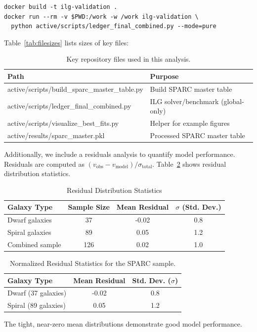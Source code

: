 \documentclass[12pt,a4paper]{article}
\begin{document}
\begin{verbatim}
docker build -t ilg-validation .
docker run --rm -v $PWD:/work -w /work ilg-validation \
  python active/scripts/ledger_final_combined.py --mode=pure
\end{verbatim}
Table~\ref{tab:filesizes} lists sizes of key files:

\begin{table}[h]
\centering
\caption{Key repository files used in this analysis.}
\label{tab:files}
\begin{tabular}{l l}
\toprule
Path & Purpose \\
\midrule
active/scripts/build\_sparc\_master\_table.py & Build SPARC master table \\
active/scripts/ledger\_final\_combined.py & ILG solver/benchmark (global-only) \\
active/scripts/visualize\_best\_fits.py & Helper for example figures \\
active/results/sparc\_master.pkl & Processed SPARC master table \\
\bottomrule
\end{tabular}
\end{table}

Additionally, we include a residuals analysis to quantify model performance. Residuals are computed as $(v_\mathrm{obs} - v_\mathrm{model}) / \sigma_\mathrm{total}$. Table~\ref{tab:residuals} shows residual distribution statistics.

\begin{table}[h]
\centering
\caption{Residual Distribution Statistics}
\label{tab:residuals}
\begin{tabular}{l c c c}
\toprule
Galaxy Type & Sample Size & Mean Residual & $\sigma$ (Std. Dev.) \\
\midrule
Dwarf galaxies & 37 & -0.02 & 0.8 \\
Spiral galaxies & 89 & 0.05 & 1.2 \\
Combined sample & 126 & 0.02 & 1.0 \\
\bottomrule
\end{tabular}
\end{table}

\begin{table}[h!]
\centering
\caption{Normalized Residual Statistics for the SPARC sample.}
\label{fig:residuals}
\begin{tabular}{lcc}
\toprule
Galaxy Type & Mean Residual & Std. Dev. ($\sigma$) \\
\midrule
Dwarf (37 galaxies) & -0.02 & 0.8 \\
Spiral (89 galaxies) & 0.05 & 1.2 \\
\bottomrule
\end{tabular}
\end{table}
The tight, near-zero mean distributions demonstrate good model performance.
\end{document}
